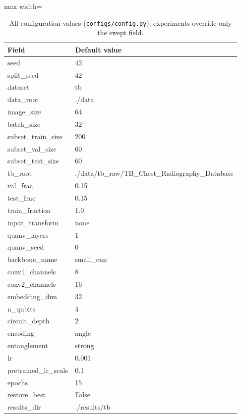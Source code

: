 \begin{table}[htbp]
\centering
\footnotesize
\caption{All configuration values (\texttt{configs/config.py}); experiments override only the swept field.}
\label{tab:hyperparameters}
\begin{adjustbox}{max width=\linewidth}
\begin{tabular}{ll}
\toprule
Field & Default value \\
\midrule
seed & 42 \\
split\_seed & 42 \\
dataset & tb \\
data\_root & ./data \\
image\_size & 64 \\
batch\_size & 32 \\
subset\_train\_size & 200 \\
subset\_val\_size & 60 \\
subset\_test\_size & 60 \\
tb\_root & ./data/tb\_raw/TB\_Chest\_Radiography\_Database \\
val\_frac & 0.15 \\
test\_frac & 0.15 \\
train\_fraction & 1.0 \\
input\_transform & none \\
quanv\_layers & 1 \\
quanv\_seed & 0 \\
backbone\_name & small\_cnn \\
conv1\_channels & 8 \\
conv2\_channels & 16 \\
embedding\_dim & 32 \\
n\_qubits & 4 \\
circuit\_depth & 2 \\
encoding & angle \\
entanglement & strong \\
lr & 0.001 \\
pretrained\_lr\_scale & 0.1 \\
epochs & 15 \\
restore\_best & False \\
results\_dir & ./results/tb \\
\bottomrule
\end{tabular}
\end{adjustbox}
\end{table}
